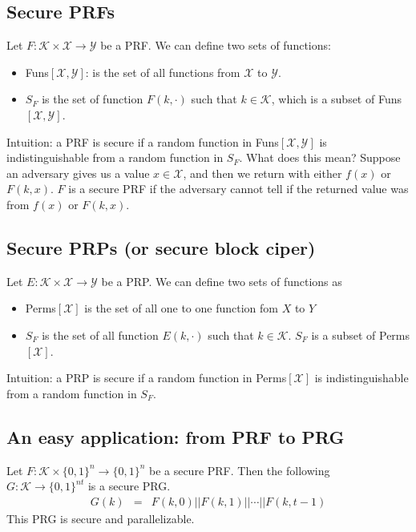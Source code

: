 \documentclass{article}
\begin{document}
\subsection{Secure PRFs}

Let $F: \mathcal{K} \times \mathcal{X} \to \mathcal{Y}$ be a PRF. We can define
two sets of functions:
\begin{itemize}
  \item Funs$[\mathcal{X, Y}]$: is the set of all functions from $\mathcal{X}$
    to $\mathcal{Y}$.
  \item $S_F$ is the set of function $F(k, \cdot)$ such that $k \in
    \mathcal{K}$, which is a subset of Funs$[\mathcal{X, Y}]$.
\end{itemize}

Intuition: a PRF is secure if a random function in Funs$[\mathcal{X,Y}]$ is
indistinguishable from a random function in $S_F$. What does this mean? Suppose
an adversary gives us a value $x \in \mathcal{X}$, and then we return with
either $f(x)$ or $F(k,x)$. $F$ is a secure PRF if the adversary cannot tell if
the returned value was from $f(x)$ or $F(k, x)$.

\subsection{Secure PRPs (or secure block ciper)}

Let $E: \mathcal{K} \times \mathcal{X} \to \mathcal{Y}$ be a PRP. We can define
two sets of functions as
\begin{itemize}
  \item Perms$[\mathcal{X}]$ is the set of all one to one function fom $X$ to
    $Y$
  \item $S_F$ is the set of all function $E(k, \cdot)$ such that $k \in
    \mathcal{K}$. $S_F$ is a subset of Perms$[\mathcal{X}]$. 
\end{itemize}

Intuition: a PRP is secure if a random function in Perms$[\mathcal{X}]$ is
indistinguishable from a random function in $S_F$.

\subsection{An easy application: from PRF to PRG}

Let $F: \mathcal{K} \times \lbrace 0, 1 \rbrace^n \to \lbrace 0, 1 \rbrace^n$ be
a secure PRF. Then the following $G: \mathcal{K} \to \lbrace 0, 1 \rbrace^{n t}$
is a secure PRG.
\begin{eqnarray}
  G(k) &=& F(k, 0) || F(k,1) || \dotsb || F(k, t-1)
\end{eqnarray}
This PRG is secure and parallelizable.
\end{document}
